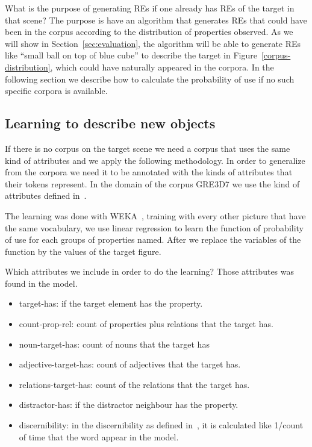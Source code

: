 What is the purpose of generating REs if one already has REs of the target in that scene? The purpose is have an algorithm that generates REs that could have been in the corpus according to the distribution of properties observed. As we will show in Section~\ref{sec:evaluation}, the algorithm will be able to generate REs like ``small ball on top of blue cube'' to describe the target in Figure~\ref{corpus-distribution}, which could have naturally appeared in the corpora. In the following section we describe how to calculate the probability of use if no such specific corpora is available. 

\subsection{Learning to describe new objects}

If there is no corpus on the target scene we need a corpus that uses the same kind of attributes and we apply the following methodology. In order to generalize from the corpora we need it to be annotated with the kinds of attributes that their tokens represent. In the domain of the corpus GRE3D7 we use the kind of attributes defined in~\cite{viet:gene11}. 

The learning was done with WEKA~\cite{Hall:WEK09}, training with every other picture that have the same vocabulary, we use linear regression to learn the function of probability of use for each groups of properties named. After we replace the variables of the function by the values of the target figure.  

Which attributes we include in order to do the learning?
Those attributes was found in the model.
\begin{itemize}
\item target-has: if the target element has the property.
\item count-prop-rel: count of properties plus relations that the target has.
\item noun-target-has: count of nouns that the target has
\item adjective-target-has: count of adjectives that the target has.
\item relations-target-has: count of the relations that the target has.
\item distractor-has: if the distractor neighbour has the property.
\item discernibility: in the discernibility as defined in~\cite{gatt:nond11}, it is calculated like 1/count of time that the word appear in the model.
\end{itemize}

